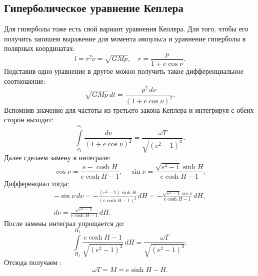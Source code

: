 \subsection{Гиперболическое уравнение Кеплера}

Для гиперболы тоже есть свой вариант уравнения Кеплера. Для того, чтобы его получить запишем выражение для момента импульса и уравнение гиперболы в полярных координатах:
\begin{equation*}
	l = r^2 \dot{\nu} = \sqrt{GMp}, \quad r = \frac{p}{1 + e \cos \nu}.
\end{equation*}
Подставив одно уравнение в другое можно получить такое дифференциальное соотношение:
\begin{equation*}
	\sqrt{GMp}\,dt=\frac{p^2 \,d\nu}{(1 + e \cos{\nu})^2}.
\end{equation*}
Вспомнив значение для частоты из третьего закона Кеплера и интегрируя с обеих сторон выходит:
\begin{equation*}
	\int\limits_{\nu_1}^{\nu_2}{\frac{d\nu}{(1+e\cos \nu)^2}} = \frac{\omega T}{\sqrt{(e^2 - 1)^3}}.
\end{equation*}
Далее сделаем замену в интеграле:
\begin{equation*}
	\cos \nu = \frac{e - \cosh H}{e \cosh H - 1}, \quad \sin \nu = \frac{\sqrt{e^2-1} \sinh H}{e \cosh H - 1}.
\end{equation*}
Дифференциал тогда:
\begin{gather*}
	-\sin \nu \, d \nu = -\frac{(e^2 - 1) \sinh H}{(e \cosh H - 1)^2}\,dH = -\frac{\sqrt{e^2-1}\sin \nu}{e \cosh H - 1}\,dH, \\
	d\nu = \frac{\sqrt{e^2-1}}{e \cosh H - 1}\,dH.
\end{gather*}
После замены интеграл упрощается до:
\begin{equation*}
	\int\limits_{H_1}^{H_2}{\frac{e \cosh H - 1}{\sqrt{(e^2-1)^3}} \,dH} = \frac{\omega T}{\sqrt{(e^2 - 1)^3}}.
\end{equation*}
Отсюда получаем :
\begin{equation}
	\omega T = M = e \sinh H - H.
\end{equation}
